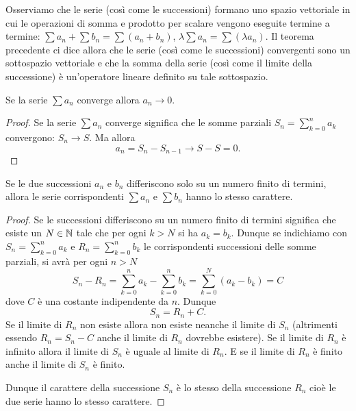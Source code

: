 Osserviamo che le serie (così come le successioni) formano uno spazio
vettoriale in cui le operazioni di somma e prodotto per scalare vengono
eseguite termine a termine: $\sum a_n + \sum b_n = \sum (a_n + b_n)$,
$\lambda \sum a_n = \sum (\lambda a_n)$.
Il teorema precedente ci dice allora che le serie (così come le successioni)
convergenti sono un sottospazio vettoriale e che la somma della serie (così come il limite della successione) è un'operatore lineare definito su tale sottospazio.

\begin{theorem}
\mymark{***}
Se la serie $\sum a_n$ converge allora $a_n \to 0$.
\end{theorem}
%
\begin{proof}
\mymark{***}
Se la serie $\sum a_n$ converge significa che le somme parziali
$S_n = \sum_{k=0}^n a_k$ convergono: $S_n \to S$. Ma allora
\[
  a_n = S_n - S_{n-1} \to S - S = 0.
\]
\end{proof}

\begin{theorem}
Se le due successioni $a_n$ e $b_n$ differiscono solo su un numero finito
di termini, allora le serie corrispondenti $\sum a_n$ e $\sum b_n$ hanno lo stesso carattere.
\end{theorem}
%
\begin{proof}
Se le successioni differiscono su un numero finito di termini significa
che esiste un $N\in {\mathbb N}$ tale che per ogni $k>N$ si ha $a_k=b_k$.
Dunque se indichiamo con $S_n = \sum_{k=0}^n a_k$ e $R_n = \sum_{k=0}^n b_k$
le corrispondenti successioni delle somme parziali, si avrà per ogni $n>N$
\[
  S_n - R_n
    = \sum_{k=0}^n a_k - \sum_{k=0}^n b_k
    = \sum_{k=0}^N (a_k - b_k) = C
\]
dove $C$ è una costante indipendente da $n$. Dunque
\[
  S_n = R_n + C.
\]
Se il limite di $R_n$ non esiste allora non esiste neanche il limite
di $S_n$ (altrimenti essendo $R_n = S_n -C$ anche il limite di $R_n$ dovrebbe esistere). Se il limite di $R_n$ è infinito allora il limite di $S_n$ è uguale
al limite di $R_n$. E se il limite di $R_n$ è finito anche il limite di $S_n$ è finito.

Dunque il carattere della successione $S_n$ è lo stesso della successione $R_n$
cioè le due serie hanno lo stesso carattere.
\end{proof}

